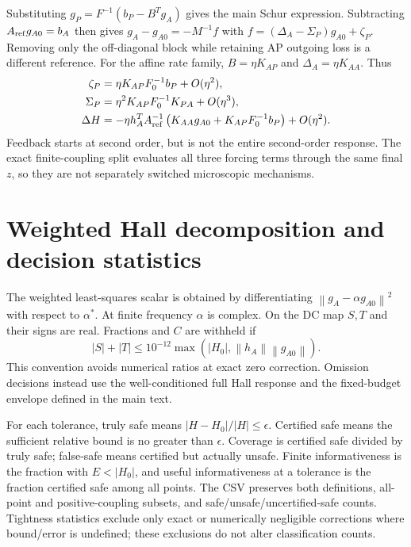 \documentclass[11pt]{article}
\newcommand{\norm}[1]{\left\lVert#1\right\rVert}
\begin{document}
Substituting $g_P=F^{-1}(b_P-B^Tg_A)$ gives the main Schur expression. Subtracting $A_{\rm ref}g_{A0}=b_A$ then gives $g_A-g_{A0}=-M^{-1}f$ with $f=(\Delta_A-\Sigma_P)g_{A0}+\zeta_P$. Removing only the off-diagonal block while retaining AP outgoing loss is a different reference. For the affine rate family, $B=\eta K_{AP}$ and $\Delta_A=\eta K_{AA}$. Thus
\begin{align}
\zeta_P&=\eta K_{AP}F_0^{-1}b_P+O(\eta^2),\\
\Sigma_P&=\eta^2K_{AP}F_0^{-1}K_{PA}+O(\eta^3),\\
\Delta H&=-\eta h_A^TA_{\rm ref}^{-1}
\left(K_{AA}g_{A0}+K_{AP}F_0^{-1}b_P\right)+O(\eta^2).
\end{align}
Feedback starts at second order, but is not the entire second-order response. The exact finite-coupling split evaluates all three forcing terms through the same final $z$, so they are not separately switched microscopic mechanisms.

\section{Weighted Hall decomposition and decision statistics}
The weighted least-squares scalar is obtained by differentiating $\norm{g_A-\alpha g_{A0}}^2$ with respect to $\alpha^*$. At finite frequency $\alpha$ is complex. On the DC map $S,T$ and their signs are real. Fractions and $C$ are withheld if
\begin{equation}
|S|+|T|\leq10^{-12}\max(|H_0|,\norm{h_A}\norm{g_{A0}}).
\end{equation}
This convention avoids numerical ratios at exact zero correction. Omission decisions instead use the well-conditioned full Hall response and the fixed-budget envelope defined in the main text.

For each tolerance, truly safe means $|H-H_0|/|H|\leq\epsilon$. Certified safe means the sufficient relative bound is no greater than $\epsilon$. Coverage is certified safe divided by truly safe; false-safe means certified but actually unsafe. Finite informativeness is the fraction with $E<|H_0|$, and useful informativeness at a tolerance is the fraction certified safe among all points. The CSV preserves both definitions, all-point and positive-coupling subsets, and safe/unsafe/uncertified-safe counts. Tightness statistics exclude only exact or numerically negligible corrections where bound/error is undefined; these exclusions do not alter classification counts.
\end{document}
